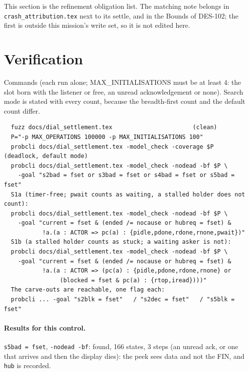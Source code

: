 \documentclass[a4paper,10pt,fleqn]{article}
\begin{document}
This section is the refinement obligation list.  The matching note belongs in
\texttt{crash\_attribution.tex} next to its settle, and in the Bounds of DES-102;
the first is outside this mission's write set, so it is not edited here.

\section{Verification}

Commands (each run alone; MAX\_INITIALISATIONS must be at least 4: the slot
born with the listener or free, an unread acknowledgement or none).  Search mode
is stated with every count, because the breadth-first count and the default
count differ.

\begin{verbatim}
  fuzz docs/dial_settlement.tex                       (clean)
  P="-p MAX_OPERATIONS 100000 -p MAX_INITIALISATIONS 100"
  probcli docs/dial_settlement.tex -model_check -coverage $P          (deadlock, default mode)
  probcli docs/dial_settlement.tex -model_check -nodead -bf $P \
    -goal "s2bad = fset or s3bad = fset or s4bad = fset or s5bad = fset"
  S1a (timer-free; pwait counts as waiting, a stalled holder does not count):
  probcli docs/dial_settlement.tex -model_check -nodead -bf $P \
    -goal "current = fset & (ended /= nocause or hubreq = fset) &
           !a.(a : ACTOR => pc(a) : {pidle,pdone,rdone,rnone,pwait})"
  S1b (a stalled holder counts as stuck; a waiting asker is not):
  probcli docs/dial_settlement.tex -model_check -nodead -bf $P \
    -goal "current = fset & (ended /= nocause or hubreq = fset) &
           !a.(a : ACTOR => (pc(a) : {pidle,pdone,rdone,rnone} or
                (blocked = fset & pc(a) : {rtop,iread})))"
  The carve-outs are reachable, one flag each:
  probcli ... -goal "s2blk = fset"   / "s2dec = fset"   / "s5blk = fset"
\end{verbatim}

\paragraph{Results for this control.}
\texttt{s5bad = fset}, \texttt{-nodead -bf}: found, 166 states, 3 steps (an
unread ack, or one that arrives and then the display dies): the peek sees data
and not the FIN, and \texttt{hub} is recorded.
\end{document}
